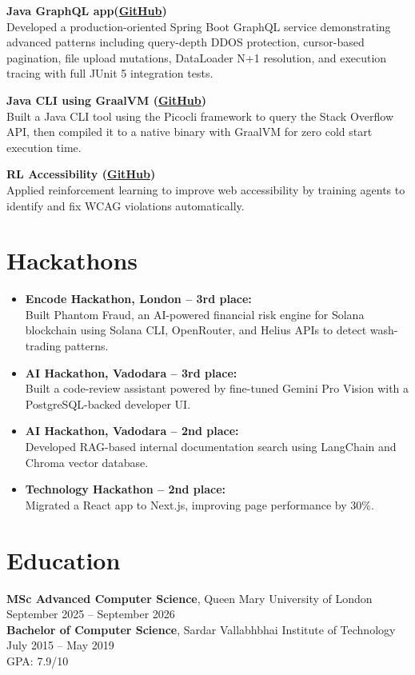 \documentclass[a4paper,10pt]{article}
\newcommand{\project}[2]{
  \textbf{\color{accent}#1}\\
  {\small #2}
}
\begin{document}
\vspace{2pt}
\project{Java GraphQL app\small{(\href{https://github.com/aymanapatel/graphql-app}{GitHub})}}{
Developed a production-oriented Spring Boot GraphQL service demonstrating advanced patterns including query-depth DDOS protection, cursor-based pagination, file upload mutations, DataLoader N+1 resolution, and execution tracing with full JUnit 5 integration tests.}

\vspace{2pt}
\project{Java CLI using GraalVM \small{(\href{https://github.com/aymanapatel/java-cli}{GitHub})}}{Built a Java CLI tool using the Picocli framework to query the Stack Overflow API, then compiled it to a native binary with GraalVM for zero cold start execution time.}


\vspace{2pt}
\project{RL Accessibility \small{(\href{https://github.com/aymanapatel/rl-a11y}{GitHub})}}{Applied reinforcement learning to improve web accessibility by training agents to identify and fix WCAG violations automatically.}

\section{Hackathons}
\begin{itemize}
  \item \textbf{Encode Hackathon, London -- 3rd place:} \\ Built Phantom Fraud, an AI-powered financial risk engine for Solana blockchain using Solana CLI, OpenRouter, and Helius APIs to detect wash-trading patterns.
  \item \textbf{AI Hackathon, Vadodara -- 3rd place:} \\ Built a code-review assistant powered by fine-tuned Gemini Pro Vision with a PostgreSQL-backed developer UI.
  \item \textbf{AI Hackathon, Vadodara -- 2nd place:} \\ Developed RAG-based internal documentation search using LangChain and Chroma vector database.
  \item \textbf{Technology Hackathon -- 2nd place:} \\ Migrated a React app to Next.js, improving page performance by 30\%.
\end{itemize}

\section{Education}
\textbf{MSc Advanced Computer Science}, Queen Mary University of London \hfill {\small September 2025 -- September 2026}\\
\textbf{Bachelor of Computer Science}, Sardar Vallabhbhai Institute of Technology \hfill {\small July 2015 -- May 2019}\\
{\small GPA: 7.9/10}
\end{document}
